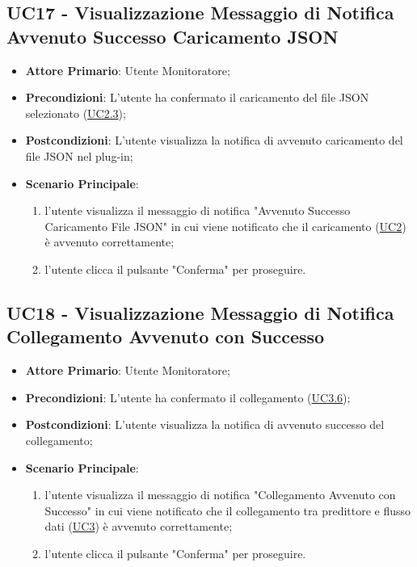 	
	\label{par:UC17}
	\subsection{UC17 - Visualizzazione Messaggio di Notifica Avvenuto Successo Caricamento JSON}
		\begin{itemize}
			\item\textbf{Attore Primario}: Utente Monitoratore;
			\item\textbf{Precondizioni}: L’utente ha confermato il caricamento del file JSON selezionato  (\hyperref[par:UC2.3]{UC2.3});
			\item\textbf{Postcondizioni}: L’utente visualizza la notifica di avvenuto caricamento del file JSON nel plug-in; 
			\item\textbf{Scenario Principale}: 
				\begin{enumerate} 
					\item l’utente visualizza il messaggio di notifica "Avvenuto Successo Caricamento File JSON" in cui viene notificato che il caricamento (\hyperref[par:UC2]{UC2}) è avvenuto correttamente;
					\item l'utente clicca il pulsante "Conferma" per proseguire.		
				\end{enumerate}		
		\end{itemize}

	
	\label{par:UC18}
	\subsection{UC18 - Visualizzazione Messaggio di Notifica Collegamento Avvenuto con Successo}
		\begin{itemize}
			\item\textbf{Attore Primario}: Utente Monitoratore;
			\item\textbf{Precondizioni}: L’utente ha confermato il collegamento (\hyperref[par:UC3.6]{UC3.6});
			\item\textbf{Postcondizioni}: L’utente visualizza la notifica di avvenuto successo del collegamento; 
			\item\textbf{Scenario Principale}: 
				\begin{enumerate} 
					\item l’utente visualizza il messaggio di notifica "Collegamento Avvenuto con Successo" in cui viene notificato che il collegamento tra predittore e flusso dati (\hyperref[par:UC3]{UC3}) è avvenuto correttamente;
					\item l'utente clicca il pulsante "Conferma" per proseguire.		
				\end{enumerate}		
		\end{itemize}
	
